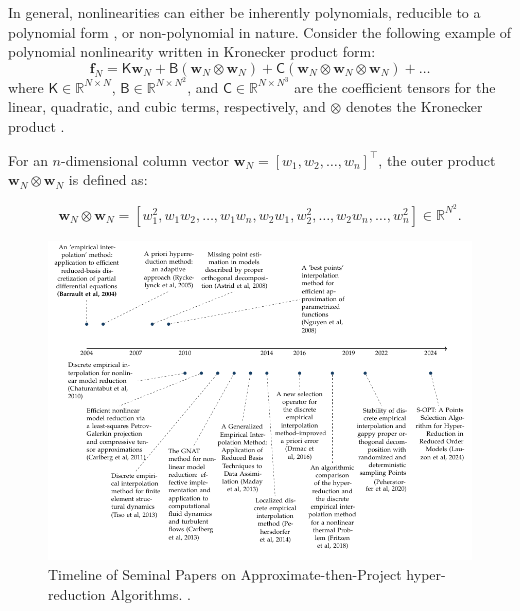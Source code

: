 \documentclass[11pt]{article}
\newcommand{\mat}[1]{\mathsf{#1}}
\begin{document}
In general, nonlinearities can either be inherently polynomials, reducible to a polynomial form \cite{gu2011qlmor}, or non-polynomial in nature.
Consider the following example of polynomial nonlinearity written in Kronecker product form:
\begin{equation}
\mathbf{f}_N = \mat{K} \mathbf{w}_N + \mat{B} (\mathbf{w}_N \otimes \mathbf{w}_N) + \mat{C} (\mathbf{w}_N \otimes \mathbf{w}_N \otimes \mathbf{w}_N) + \dots
\label{eq:poly_non}
\end{equation}
where $\mat{K} \in \mathbb{R}^{N \times N}$, $\mat{B} \in \mathbb{R}^{N \times N^2}$, and $\mat{C} \in \mathbb{R}^{N \times N^3}$ are the coefficient tensors for the linear, quadratic, and cubic terms, respectively, and $\otimes$ denotes the Kronecker product \cite{kolda2009tensor}.

For an $n$-dimensional column vector $\mathbf{w}_N = [w_1, w_2, \dots, w_n]^\top$, the outer product $\mathbf{w}_N \otimes \mathbf{w}_N$ is defined as:

\begin{equation}
\mathbf{w}_N \otimes \mathbf{w}_N = [w_1^2, w_1w_2, \dots, w_1w_n, w_2w_1, w_2^2, \dots, w_2w_n, \dots, w_n^2] \in \mathbb{R}^{N^2}.
\label{eq:op}
\end{equation}


\begin{figure}
\centering
\includegraphics[width=\textwidth]{ATP.pdf}
\caption{Timeline of Seminal Papers on Approximate-then-Project hyper-reduction Algorithms. \cite{barrault2004empirical,ryckelynck2005priori,nguyen2007best,astrid2008missing,chaturantabut2010nonlinear,carlberg2011efficient,tiso2013discrete,carlberg2013gnat,peherstorfer2014localized,drmac2016new,peherstorfer2020stability,lauzon2024s-opt,Fritzen_2018,Maday_2013}.}
\label{fig:ATP_LIT}
\end{figure}
\end{document}

